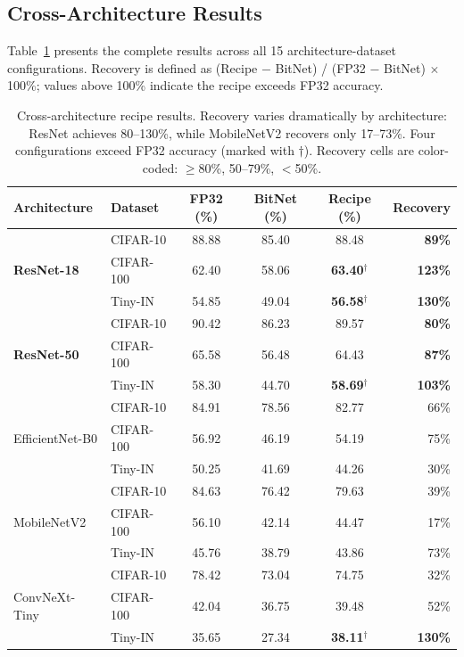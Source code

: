 \documentclass[10pt]{article}
\begin{document}
\subsection{Cross-Architecture Results}

Table~\ref{tab:arch_results} presents the complete results across all 15 architecture-dataset configurations. Recovery is defined as (Recipe $-$ BitNet) / (FP32 $-$ BitNet) $\times$ 100\%; values above 100\% indicate the recipe exceeds FP32 accuracy.

\begin{table}[ht]
\centering
\caption{Cross-architecture recipe results. Recovery varies dramatically by architecture: ResNet achieves 80--130\%, while MobileNetV2 recovers only 17--73\%. Four configurations exceed FP32 accuracy (marked with $\dagger$). Recovery cells are color-coded: \colorbox{recovhigh}{$\geq$80\%}, \colorbox{recovmed}{50--79\%}, \colorbox{recovlow}{$<$50\%}.}
\label{tab:arch_results}
\begin{tabular}{llcccr}
\toprule
Architecture & Dataset & FP32 (\%) & BitNet (\%) & Recipe (\%) & Recovery \\
\midrule
\multirow{3}{*}{\textbf{ResNet-18}} & CIFAR-10 & 88.88 & 85.40 & 88.48 & \cellcolor{recovhigh}\textbf{89\%} \\
 & CIFAR-100 & 62.40 & 58.06 & \textbf{63.40}$^\dagger$ & \cellcolor{recovhigh}\textbf{123\%} \\
 & Tiny-IN & 54.85 & 49.04 & \textbf{56.58}$^\dagger$ & \cellcolor{recovhigh}\textbf{130\%} \\
\midrule
\multirow{3}{*}{\textbf{ResNet-50}} & CIFAR-10 & 90.42 & 86.23 & 89.57 & \cellcolor{recovhigh}\textbf{80\%} \\
 & CIFAR-100 & 65.58 & 56.48 & 64.43 & \cellcolor{recovhigh}\textbf{87\%} \\
 & Tiny-IN & 58.30 & 44.70 & \textbf{58.69}$^\dagger$ & \cellcolor{recovhigh}\textbf{103\%} \\
\midrule
\multirow{3}{*}{EfficientNet-B0} & CIFAR-10 & 84.91 & 78.56 & 82.77 & \cellcolor{recovmed}66\% \\
 & CIFAR-100 & 56.92 & 46.19 & 54.19 & \cellcolor{recovmed}75\% \\
 & Tiny-IN & 50.25 & 41.69 & 44.26 & \cellcolor{recovlow}30\% \\
\midrule
\multirow{3}{*}{MobileNetV2} & CIFAR-10 & 84.63 & 76.42 & 79.63 & \cellcolor{recovlow}39\% \\
 & CIFAR-100 & 56.10 & 42.14 & 44.47 & \cellcolor{recovlow}17\% \\
 & Tiny-IN & 45.76 & 38.79 & 43.86 & \cellcolor{recovmed}73\% \\
\midrule
\multirow{3}{*}{ConvNeXt-Tiny} & CIFAR-10 & 78.42 & 73.04 & 74.75 & \cellcolor{recovlow}32\% \\
 & CIFAR-100 & 42.04 & 36.75 & 39.48 & \cellcolor{recovmed}52\% \\
 & Tiny-IN & 35.65 & 27.34 & \textbf{38.11}$^\dagger$ & \cellcolor{recovhigh}\textbf{130\%} \\
\bottomrule
\end{tabular}
\end{table}
\end{document}

